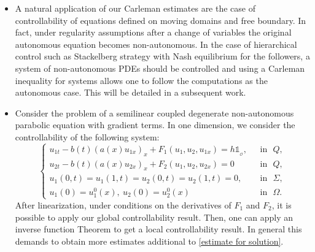 \documentclass[11pt,oneside,a4papper]{osajnl}
\newcommand{\cara}{\mathbb{1}}
\begin{document}
\begin{itemize}
	\item A natural application of our Carleman estimates are the case of controllability of equations defined on moving domains and free boundary. In fact, under regularity assumptions after a change of variables the original autonomous equation becomes non-autonomous. In the case of hierarchical control such as Stackelberg strategy with Nash equilibrium for the followers, a system of non-autonomous PDEs should be controlled and using a Carleman inequality for systems allows one to follow the computations as the autonomous case. This will be detailed in a subsequent work.
\item Consider the problem of a semilinear coupled degenerate non-autonomous parabolic equation with gradient terms. In one dimension, we consider the controllability of the following system:
$$\begin{cases}
    u_{1t}-b(t)({a}(x)u_{1x})_{x}+F_1(u_1,u_2,u_{1x})= h\cara_{_{\mathcal{O}}}, & \ \ \ \text{in} \ \ \ Q,\\
	u_{2t}-b(t)({a}(x)u_{2x})_{x}+F_2(u_1,u_2,u_{2x})=0 & \ \ \ \text{in} \ \ \ Q,\\
	u_1(0,t)=u_1(1,t)=u_2(0,t)=u_2(1,t)=0, & \ \ \ \text{in} \ \ \ \Sigma,\\
	u_1(0)=u_1^0(x), \ u_2(0)=u_2^0(x) & \ \ \ \text{in} \ \ \ \Omega.
\end{cases}$$
After linearization, under conditions on the derivatives of $F_1$ and $F_2$, it is possible to apply our global controllability result. Then, one can apply an inverse function Theorem to get a local controllability result. In general this demands to obtain more estimates additional to \eqref{estimate for solution}.



\end{itemize}
\end{document}
